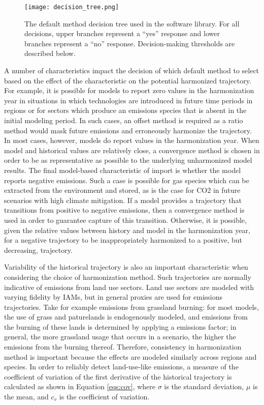 \begin{figure}
  \begin{center}
    \texttt{[image: decision\_tree.png]}
    \caption[]{
      \label{fig:decision_tree}
      The default method decision tree used in the  software
      library. For all decisions, upper branches represent a ``yes'' response
      and lower branches represent a ``no'' response. Decision-making thresholds
      are described below.}
  \end{center}
\end{figure}

A number of characteristics impact the decision of which default method to
select based on the effect of the characteristic on the potential harmonized
trajectory. For example, it is possible for models to report zero values in the
harmonization year in situations in which technologies are introduced in future
time periods in regions or for sectors which produce an emissions species that
is absent in the initial modeling period. In such cases, an offset method is
required as a ratio method would mask future emissions and erroneously harmonize
the trajectory. In most cases, however, models do report values in the
harmonization year. When model and historical values are relatively close, a
convergence method is chosen in order to be as representative as possible to the
underlying unharmonized model results. The final model-based characteristic of
import is whether the model reports negative emissions. Such a case is possible
for gas species which can be extracted from the environment and stored, as is
the case for CO2 in future scenarios with high climate mitigation. If a model
provides a trajectory that transitions from positive to negative emissions, then
a convergence method is used in order to guarantee capture of this
transition. Otherwise, it is possible, given the relative values between history
and model in the harmonization year, for a negative trajectory to be
inappropriately harmonized to a positive, but decreasing, trajectory.

Variability of the historical trajectory is also an important characteristic
when considering the choice of harmonization method. Such trajectories are
normally indicative of emissions from land use sectors. Land use sectors are
modeled with varying fidelity by IAMs, but in general proxies are used for
emissions trajectories. Take for example emissions from grassland burning: for
most models, the use of grass and paturelands is endogenously modeled, and
emissions from the burning of these lands is determined by applying a emissions
factor; in general, the more grassland usage that occurs in a scenario, the
higher the emissions from the burning thereof. Therefore, consistency in
harmonization method is important because the effects are modeled similarly
across regions and species. In order to reliably detect land-use-like emissions,
a measure of the coefficient of variation of the first derivative of the
historical trajectory is calculated as shown in Equation \ref{eqs:cov}, where
$\sigma$ is the standard deviation, $\mu$ is the mean, and $c_v$ is the
coefficient of variation.

